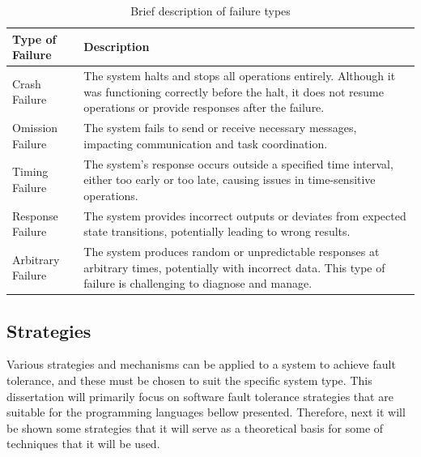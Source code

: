 \begin{table}[h!]
    \centering
    \begin{tabular}{|l|p{11.3cm}|}
        \hline
        \textbf{Type of Failure} & \textbf{Description}                                                                                                                                                                                       \\ \hline
        Crash Failure            & The system halts and stops all operations entirely. Although it was functioning correctly before the halt, it does not resume operations or provide responses after the failure. \cite{Tanenbaum2023}      \\ \hline
        Omission Failure         & The system fails to send or receive necessary messages, impacting communication and task coordination. \cite{Isukapalli2024}                                                                               \\ \hline
        Timing Failure           & The system’s response occurs outside a specified time interval, either too early or too late, causing issues in time-sensitive operations. \cite{Isukapalli2024}                                           \\ \hline
        Response Failure         & The system provides incorrect outputs or deviates from expected state transitions, potentially leading to wrong results. \cite{Tanenbaum2023}                                                          \\ \hline
        Arbitrary Failure        & The system produces random or unpredictable responses at arbitrary times, potentially with incorrect data. This type of failure is challenging to diagnose and manage. \cite{Tanenbaum2023} \\ \hline
    \end{tabular}
    \caption{Brief description of failure types}
    \label{tab:failure_types}
\end{table}

\subsection{Strategies}

Various strategies and mechanisms can be applied to a system to achieve fault tolerance, and these must be chosen to suit the specific system type. This dissertation will primarily focus on software fault tolerance strategies that are suitable for the programming languages bellow presented. Therefore, next it will be shown some strategies that it will serve as a theoretical basis for some of techniques that it will be used.

